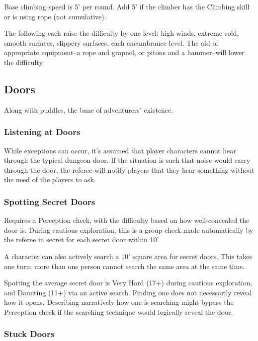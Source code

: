 \documentclass{article}
\begin{document}
\begin{multicols}{2}
Base climbing speed is 5' per round. Add 5' if the climber has the
Climbing skill or is using rope (not cumulative).

The following each raise the difficulty by one level: high winds,
extreme cold, smooth surfaces, slippery surfaces, each encumbrance
level. The aid of appropriate equipment--a rope and grapnel, or pitons
and a hammer--will lower the difficulty.

\subsection{Doors}\label{doors}

Along with puddles, the bane of adventurers' existence.

\subsubsection{Listening at Doors}\label{listening-at-doors}

While exceptions can occur, it's assumed that player characters cannot
hear through the typical dungeon door. If the situation is such that
noise would carry through the door, the referee will notify players that
they hear something without the need of the players to ask.

\subsubsection{Spotting Secret Doors}\label{spotting-secret-doors}

Requires a Perception check, with the difficulty based on how
well-concealed the door is. During cautious exploration, this is a group
check made automatically by the referee in secret for each secret door
within 10'.

A character can also actively search a 10' square area for secret doors.
This takes one turn; more than one person cannot search the same area at
the same time.

Spotting the average secret door is Very Hard (17+) during cautious
exploration, and Daunting (11+) via an active search. Finding one does
not necessarily reveal how it opens. Describing narratively how one is
searching might bypass the Perception check if the searching technique
would logically reveal the door.

\subsubsection{Stuck Doors}\label{stuck-doors}


\end{multicols}
\end{document}
